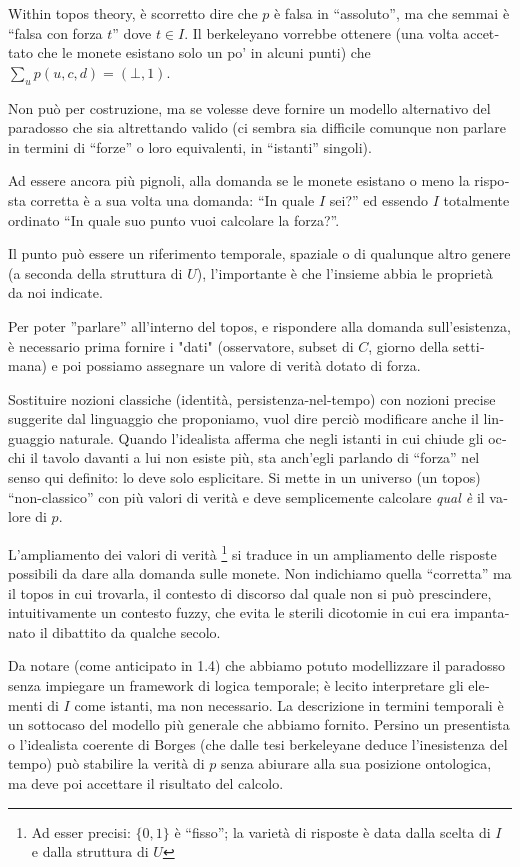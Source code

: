 \begin{italian}
	Within topos theory, è scorretto dire che $p$ è falsa in ``assoluto'', ma che semmai è ``falsa con forza $t$'' dove $t \in I$. Il berkeleyano vorrebbe ottenere (una volta accettato che le monete esistano solo un po' in alcuni punti) che $\sum_u p(u,c,d) = (\bot,1)$.

	Non può per costruzione, ma se volesse deve fornire un modello alternativo del paradosso che sia altrettando valido (ci sembra sia difficile comunque non parlare in termini di ``forze'' o loro equivalenti, in ``istanti'' singoli).

	Ad essere ancora più pignoli, alla domanda se le monete esistano o meno la risposta corretta è a sua volta una domanda: ``In quale $I$ sei?'' ed essendo $I$ totalmente ordinato ``In quale suo punto vuoi calcolare la forza?''.

	Il punto può essere un riferimento temporale, spaziale o di qualunque altro genere (a seconda della struttura di $U$), l'importante è che l'insieme abbia le proprietà da noi indicate.

	Per poter ''parlare'' all'interno del topos, e rispondere alla domanda sull'esistenza, è necessario prima fornire i "dati" (osservatore, subset di $C$, giorno della settimana) e poi possiamo assegnare un valore di verità dotato di forza.

	Sostituire nozioni classiche (identità, persistenza-nel-tempo) con nozioni precise suggerite dal linguaggio che proponiamo, vuol dire perciò modificare anche il linguaggio naturale. Quando l'idealista afferma che negli istanti in cui chiude gli occhi il tavolo davanti a lui non esiste più, sta anch'egli parlando di ``forza'' nel senso qui definito: lo deve solo esplicitare. Si mette in un universo (un topos) ``non-classico'' con più valori di verità e deve semplicemente calcolare \emph{qual è} il valore di $p$.

	L'ampliamento dei valori di verità \footnote{Ad esser precisi: $\{0,1\}$ è ``fisso''; la varietà di risposte è data dalla scelta di $I$ e dalla struttura di $U$} si traduce in un ampliamento delle risposte possibili da dare alla domanda sulle monete. Non indichiamo quella ``corretta'' ma il topos in cui trovarla, il contesto di discorso dal quale non si può prescindere, intuitivamente un contesto fuzzy, che evita le sterili dicotomie in cui era impantanato il dibattito da qualche secolo.

	Da notare (come anticipato in 1.4) che abbiamo potuto modellizzare il paradosso senza impiegare un framework di logica temporale; è lecito interpretare gli elementi di $I$ come istanti, ma non necessario. La descrizione in termini temporali è un sottocaso del modello più generale che abbiamo fornito. Persino un presentista o l'idealista coerente di Borges (che dalle tesi berkeleyane deduce l'inesistenza del tempo) può stabilire la verità di $p$ senza abiurare alla sua posizione ontologica, ma deve poi accettare il risultato del calcolo.


\end{italian}

